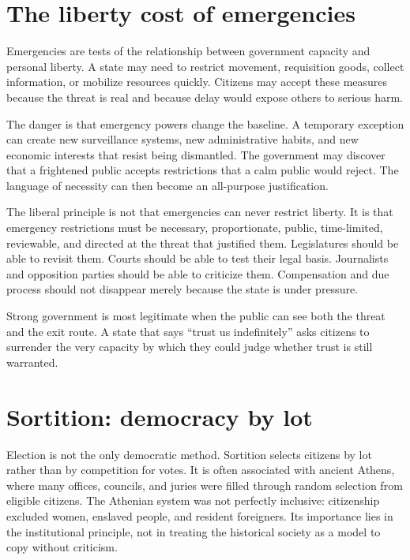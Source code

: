 ﻿\documentclass[12pt,a4paper]{book}
\begin{document}
\section{The liberty cost of emergencies}

Emergencies are tests of the relationship between government capacity and
personal liberty.  A state may need to restrict movement, requisition goods,
collect information, or mobilize resources quickly.  Citizens may accept
these measures because the threat is real and because delay would expose
others to serious harm.

The danger is that emergency powers change the baseline.  A temporary
exception can create new surveillance systems, new administrative habits,
and new economic interests that resist being dismantled.  The government
may discover that a frightened public accepts restrictions that a calm public
would reject.  The language of necessity can then become an all-purpose
justification.

The liberal principle is not that emergencies can never restrict liberty.
It is that emergency restrictions must be necessary, proportionate, public,
time-limited, reviewable, and directed at the threat that justified them.
Legislatures should be able to revisit them.  Courts should be able to test
their legal basis.  Journalists and opposition parties should be able to
criticize them.  Compensation and due process should not disappear merely
because the state is under pressure.

Strong government is most legitimate when the public can see both the threat
and the exit route.  A state that says ``trust us indefinitely'' asks citizens
to surrender the very capacity by which they could judge whether trust is
still warranted.

\section{Sortition: democracy by lot}

Election is not the only democratic method.  Sortition selects citizens by
lot rather than by competition for votes.  It is often associated with
ancient Athens, where many offices, councils, and juries were filled through
random selection from eligible citizens.  The Athenian system was not
perfectly inclusive: citizenship excluded women, enslaved people, and
resident foreigners.  Its importance lies in the institutional principle,
not in treating the historical society as a model to copy without criticism.
\end{document}
